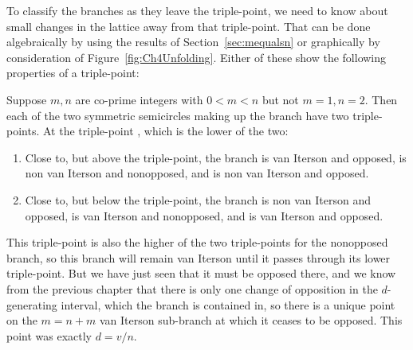 %
%
%
To classify the branches as they leave the triple-point, we need to know about small changes in the lattice away from that triple-point. That can be done algebraically by using the results of Section~\ref{sec:mequalsn} or graphically by consideration of Figure~\ref{fig:Ch4Unfolding}. Either of these show the following properties of a triple-point:
\begin{theorem}
	Suppose $m,n$ are co-prime integers with $0<m<n$ but not $m=1,n=2$. Then each of the two symmetric semicircles making up the branch  have two triple-points. At the triple-point , which is the lower of the two:
	\begin{enumerate}
		\item Close to, but above the triple-point, the branch   is van Iterson and opposed,  is non van Iterson  and nonopposed, and  is non van Iterson and opposed. 
		\item Close to, but below the triple-point, the branch  is non van Iterson and opposed,  is van Iterson and nonopposed, and  is van Iterson and opposed.
	\end{enumerate}
	\label{thm:tp}
\end{theorem}
This triple-point is also the higher of the two triple-points for the nonopposed branch, so this branch will remain van Iterson until it passes through its lower triple-point. But we have just seen that it must be opposed there, 
and we know from the previous chapter that there is only one change of opposition in the $d$-generating interval, which the branch is contained in, so there is a unique point on the $m=n+m$ van Iterson sub-branch at which it ceases to be opposed. This point was exactly $d=v/n$. 
